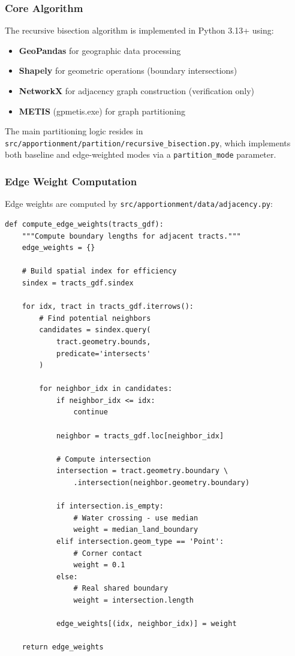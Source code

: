 \subsubsection{Core Algorithm}

The recursive bisection algorithm is implemented in Python 3.13+ using:
\begin{itemize}
\item \textbf{GeoPandas} for geographic data processing
\item \textbf{Shapely} for geometric operations (boundary intersections)
\item \textbf{NetworkX} for adjacency graph construction (verification only)
\item \textbf{METIS} (gpmetis.exe) for graph partitioning
\end{itemize}

The main partitioning logic resides in \texttt{src/apportionment/partition/recursive\_bisection.py}, which implements both baseline and edge-weighted modes via a \texttt{partition\_mode} parameter.

\subsubsection{Edge Weight Computation}

Edge weights are computed by \texttt{src/apportionment/data/adjacency.py}:

\begin{verbatim}
def compute_edge_weights(tracts_gdf):
    """Compute boundary lengths for adjacent tracts."""
    edge_weights = {}

    # Build spatial index for efficiency
    sindex = tracts_gdf.sindex

    for idx, tract in tracts_gdf.iterrows():
        # Find potential neighbors
        candidates = sindex.query(
            tract.geometry.bounds,
            predicate='intersects'
        )

        for neighbor_idx in candidates:
            if neighbor_idx <= idx:
                continue

            neighbor = tracts_gdf.loc[neighbor_idx]

            # Compute intersection
            intersection = tract.geometry.boundary \
                .intersection(neighbor.geometry.boundary)

            if intersection.is_empty:
                # Water crossing - use median
                weight = median_land_boundary
            elif intersection.geom_type == 'Point':
                # Corner contact
                weight = 0.1
            else:
                # Real shared boundary
                weight = intersection.length

            edge_weights[(idx, neighbor_idx)] = weight

    return edge_weights
\end{verbatim}

